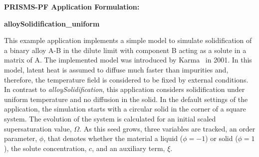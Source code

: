 \documentclass[10pt]{article}
\begin{document}
\def\Bomega{\mbox{\boldmath$\omega$}}
\def\Bvarepsilon{\mbox{\boldmath$\varepsilon$}}
\def\Bvartheta{\mbox{\boldmath$\vartheta$}}
\def\Bvarpi{\mbox{\boldmath$\varpi$}}
\def\Bvarrho{\mbox{\boldmath$\varrho$}}
\def\Bvarsigma{\mbox{\boldmath$\varsigma$}}
\def\Bvarphi{\mbox{\boldmath$\varphi$}}
\def\bone{\mathbf{1}}
\def\bzero{\mathbf{0}}
\def\bA{\mbox{\boldmath$ A$}}
\def\bB{\mbox{\boldmath$ B$}}
\def\bC{\mbox{\boldmath$ C$}}
\def\bD{\mbox{\boldmath$ D$}}
\def\bE{\mbox{\boldmath$ E$}}
\def\bF{\mbox{\boldmath$ F$}}
\def\bG{\mbox{\boldmath$ G$}}
\def\bH{\mbox{\boldmath$ H$}}
\def\bI{\mbox{\boldmath$ I$}}
\def\bJ{\mbox{\boldmath$ J$}}
\def\bK{\mbox{\boldmath$ K$}}
\def\bL{\mbox{\boldmath$ L$}}
\def\bM{\mbox{\boldmath$ M$}}
\def\bN{\mbox{\boldmath$ N$}}
\def\bO{\mbox{\boldmath$ O$}}
\def\bP{\mbox{\boldmath$ P$}}
\def\bQ{\mbox{\boldmath$ Q$}}
\def\bR{\mbox{\boldmath$ R$}}
\def\bS{\mbox{\boldmath$ S$}}
\def\bT{\mbox{\boldmath$ T$}}
\def\bU{\mbox{\boldmath$ U$}}
\def\bV{\mbox{\boldmath$ V$}}
\def\bW{\mbox{\boldmath$ W$}}
\def\bX{\mbox{\boldmath$ X$}}
\def\bY{\mbox{\boldmath$ Y$}}
\def\bZ{\mbox{\boldmath$ Z$}}
\def\ba{\mbox{\boldmath$ a$}}
\def\bb{\mbox{\boldmath$ b$}}
\def\bc{\mbox{\boldmath$ c$}}
\def\bd{\mbox{\boldmath$ d$}}
\def\be{\mbox{\boldmath$ e$}}
\def\bff{\mbox{\boldmath$ f$}}
\def\bg{\mbox{\boldmath$ g$}}
\def\bh{\mbox{\boldmath$ h$}}
\def\bi{\mbox{\boldmath$ i$}}
\def\bj{\mbox{\boldmath$ j$}}
\def\bk{\mbox{\boldmath$ k$}}
\def\bl{\mbox{\boldmath$ l$}}
\def\bm{\mbox{\boldmath$ m$}}
\def\bn{\mbox{\boldmath$ n$}}
\def\bo{\mbox{\boldmath$ o$}}
\def\bp{\mbox{\boldmath$ p$}}
\def\bq{\mbox{\boldmath$ q$}}
\def\br{\mbox{\boldmath$ r$}}
\def\bs{\mbox{\boldmath$ s$}}
\def\bt{\mbox{\boldmath$ t$}}
\def\bu{\mbox{\boldmath$ u$}}
\def\bv{\mbox{\boldmath$ v$}}
\def\bw{\mbox{\boldmath$ w$}}
\def\bx{\mbox{\boldmath$ x$}}
\def\by{\mbox{\boldmath$ y$}}
\def\bz{\mbox{\boldmath$ z$}}
\centerline{\Large{\bf PRISMS-PF Application Formulation:}}
\smallskip
\centerline{\Large{\bf alloySolidification\_uniform}}
\bigskip
This example application implements a simple model to simulate solidification of a binary alloy A-B in the dilute limit with component B acting as a solute in a matrix of A. The implemented model was introduced by Karma~\cite{Karma2001} in 2001. In this model, latent heat is assumed to diffuse much faster than impurities and, therefore, the temperature field is considered to be fixed by external conditions. In contrast to {\it alloySolidification}, this application considers solidification under uniform temperature and no diffusion in the solid.  In the default settings of the application, the simulation starts with a circular solid in the corner of a square system. The evolution of the system is calculated for an initial scaled supersaturation value, $\Omega$. As this seed grows, three variables are tracked, an order parameter, $\phi$, that denotes whether the material a liquid ($\phi=-1$) or solid ($\phi=1$), the solute concentration, $c$, and an auxiliary term, $\xi$. 
\end{document}
